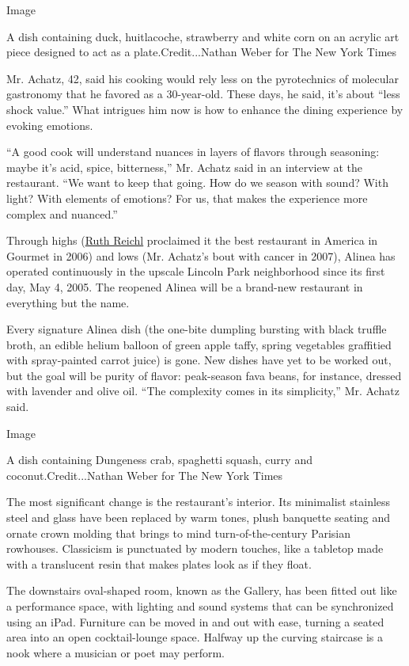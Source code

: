 Image

A dish containing duck, huitlacoche, strawberry and white corn on an
acrylic art piece designed to act as a plate.Credit...Nathan Weber for
The New York Times

Mr. Achatz, 42, said his cooking would rely less on the pyrotechnics of
molecular gastronomy that he favored as a 30-year-old. These days, he
said, it's about ``less shock value.'' What intrigues him now is how to
enhance the dining experience by evoking emotions.

``A good cook will understand nuances in layers of flavors through
seasoning: maybe it's acid, spice, bitterness,'' Mr. Achatz said in an
interview at the restaurant. ``We want to keep that going. How do we
season with sound? With light? With elements of emotions? For us, that
makes the experience more complex and nuanced.''

Through highs
(\href{http://www.nytimes3xbfgragh.onion/2015/09/16/dining/ruth-reichl-my-kitchen-year.html}{Ruth
Reichl} proclaimed it the best restaurant in America in Gourmet in 2006)
and lows (Mr. Achatz's bout with cancer in 2007), Alinea has operated
continuously in the upscale Lincoln Park neighborhood since its first
day, May 4, 2005. The reopened Alinea will be a brand-new restaurant in
everything but the name.

Every signature Alinea dish (the one-bite dumpling bursting with black
truffle broth, an edible helium balloon of green apple taffy, spring
vegetables graffitied with spray-painted carrot juice) is gone. New
dishes have yet to be worked out, but the goal will be purity of flavor:
peak-season fava beans, for instance, dressed with lavender and olive
oil. ``The complexity comes in its simplicity,'' Mr. Achatz said.

Image

A dish containing Dungeness crab, spaghetti squash, curry and
coconut.Credit...Nathan Weber for The New York Times

The most significant change is the restaurant's interior. Its minimalist
stainless steel and glass have been replaced by warm tones, plush
banquette seating and ornate crown molding that brings to mind
turn-of-the-century Parisian rowhouses. Classicism is punctuated by
modern touches, like a tabletop made with a translucent resin that makes
plates look as if they float.

The downstairs oval-shaped room, known as the Gallery, has been fitted
out like a performance space, with lighting and sound systems that can
be synchronized using an iPad. Furniture can be moved in and out with
ease, turning a seated area into an open cocktail-lounge space. Halfway
up the curving staircase is a nook where a musician or poet may perform.

